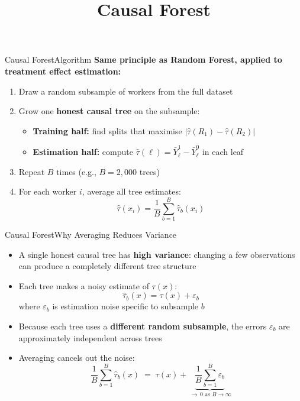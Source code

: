 \documentclass[dvipsnames,hyperref={pdfpagelabels=false}]{beamer}
\begin{document}
\title[]
{Causal Forest}

\author{}
\institute{}
\date{}

\begin{frame}{}
	\titlepage
\end{frame}




\begin{frame}{Causal Forest}{Algorithm}
\textbf{Same principle as Random Forest, applied to treatment effect estimation:}
\vspace{0.25cm}
\begin{enumerate}
	\item Draw a random subsample of workers from the full dataset
	\vspace{0.2cm}
	\item Grow one \textbf{honest causal tree} on the subsample:
	\vspace{0.1cm}
	\begin{itemize}
		\item \textbf{Training half:} find splits that maximise $|\hat{\tau}(R_1) - \hat{\tau}(R_2)|$
		\item \textbf{Estimation half:} compute $\hat{\tau}(\ell) = \bar{Y}^1_\ell - \bar{Y}^0_\ell$ in each leaf
	\end{itemize}
	\vspace{0.2cm}
	\item Repeat $B$ times (e.g., $B = 2{,}000$ trees)
	\vspace{0.2cm}
	\item For each worker $i$, average all tree estimates:
	\[
		\hat{\tau}(x_i) = \frac{1}{B}\sum_{b=1}^{B} \hat{\tau}_b(x_i)
	\]
\end{enumerate}
\end{frame}




\begin{frame}{Causal Forest}{Why Averaging Reduces Variance}
\begin{itemize}
	\item A single honest causal tree has \textbf{high variance}: changing a few observations can produce a completely different tree structure
	\vspace{0.3cm}
	\item Each tree makes a noisy estimate of $\tau(x)$:
	\[
		\hat{\tau}_b(x) = \tau(x) + \varepsilon_b
	\]
	\vspace{0.1cm}
	where $\varepsilon_b$ is estimation noise specific to subsample $b$
	\vspace{0.3cm}
	\item Because each tree uses a \textbf{different random subsample}, the errors $\varepsilon_b$ are approximately independent across trees
	\vspace{0.3cm}
	\item Averaging cancels out the noise:
	\[
		\frac{1}{B}\sum_{b=1}^{B}\hat{\tau}_b(x)
		\;=\; \tau(x) + \underbrace{\frac{1}{B}\sum_{b=1}^{B}\varepsilon_b}_{\;\to\, 0 \text{ as } B \to \infty}
	\]
\end{itemize}
\end{frame}
\end{document}
